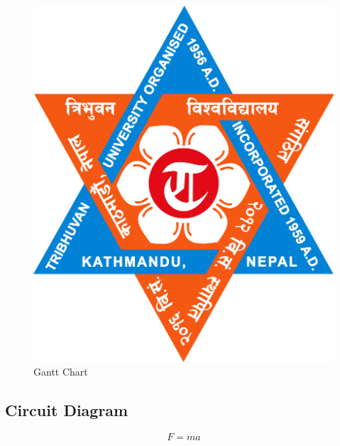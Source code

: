 \documentclass{ioereport}
\begin{document}
    \begin{figure}[H]
        \centering
        \includegraphics[angle=90, origin=c, height=0.4\textheight]{TU_Logo.jpg}
        \caption{Gantt Chart}
        \label{fig:gantt}
    \end{figure}
    
    \pagebreak
    
    \subsection{Circuit Diagram}
    \begin{equation}
        F = ma 
    \end{equation}

\pagebreak



\end{document}
